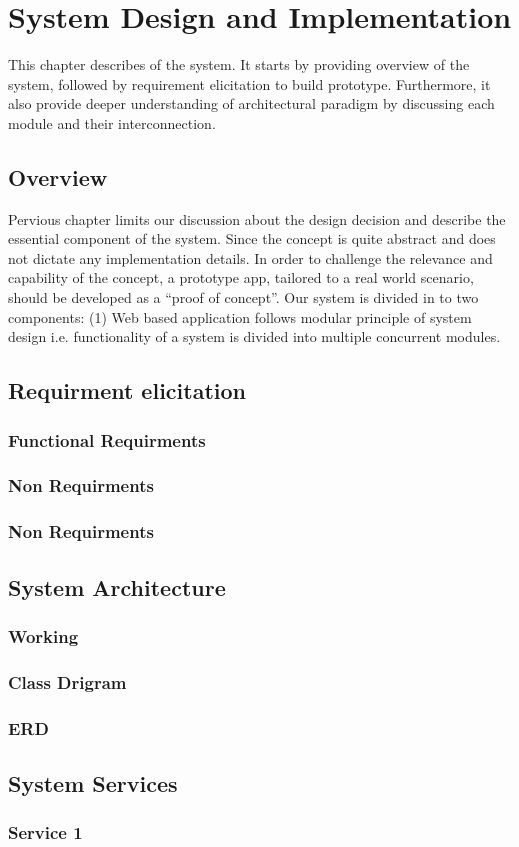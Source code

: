 \chapter{System Design and Implementation}

This chapter describes of the system. It starts by providing overview of the system, followed by requirement elicitation to build prototype. Furthermore, it also provide deeper understanding of architectural paradigm by discussing each module and their interconnection.

\section{Overview}

Pervious chapter limits our discussion about the design decision and describe the essential component of the system.  Since the concept is quite abstract and does not dictate any implementation details.  In order to challenge the relevance and capability of the concept, a prototype app, tailored to a real world scenario, should be developed as a “proof of concept”. Our system is divided in to two components: (1) Web based application follows modular principle of system design i.e. functionality of a system is divided into multiple concurrent modules. 

\section{Requirment elicitation}
\subsection{Functional Requirments}
\subsection{Non Requirments}
\subsection{Non Requirments}

\section{System Architecture}

\subsection{Working}

\subsection{Class Drigram}

\subsection{ERD}

\section{System Services}

\subsection{Service 1}
